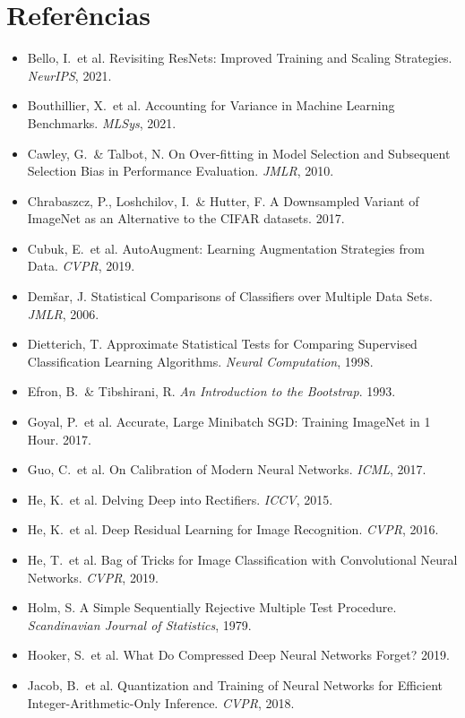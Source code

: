 \documentclass[10pt,a4paper]{article}
\begin{document}
\section*{Referências}
\begingroup\small\color{black!85}
\begin{itemize}[leftmargin=1.2em,itemsep=0.1em,topsep=0.2em,label={\color{accent}\textbullet}]
\item Bello, I.\ et al. Revisiting ResNets: Improved Training and Scaling Strategies. \emph{NeurIPS}, 2021.
\item Bouthillier, X.\ et al. Accounting for Variance in Machine Learning Benchmarks. \emph{MLSys}, 2021.
\item Cawley, G.\ \& Talbot, N. On Over-fitting in Model Selection and Subsequent Selection Bias in Performance Evaluation. \emph{JMLR}, 2010.
\item Chrabaszcz, P., Loshchilov, I.\ \& Hutter, F. A Downsampled Variant of ImageNet as an Alternative to the CIFAR datasets. 2017.
\item Cubuk, E.\ et al. AutoAugment: Learning Augmentation Strategies from Data. \emph{CVPR}, 2019.
\item Demšar, J. Statistical Comparisons of Classifiers over Multiple Data Sets. \emph{JMLR}, 2006.
\item Dietterich, T. Approximate Statistical Tests for Comparing Supervised Classification Learning Algorithms. \emph{Neural Computation}, 1998.
\item Efron, B.\ \& Tibshirani, R. \emph{An Introduction to the Bootstrap}. 1993.
\item Goyal, P.\ et al. Accurate, Large Minibatch SGD: Training ImageNet in 1 Hour. 2017.
\item Guo, C.\ et al. On Calibration of Modern Neural Networks. \emph{ICML}, 2017.
\item He, K.\ et al. Delving Deep into Rectifiers. \emph{ICCV}, 2015.
\item He, K.\ et al. Deep Residual Learning for Image Recognition. \emph{CVPR}, 2016.
\item He, T.\ et al. Bag of Tricks for Image Classification with Convolutional Neural Networks. \emph{CVPR}, 2019.
\item Holm, S. A Simple Sequentially Rejective Multiple Test Procedure. \emph{Scandinavian Journal of Statistics}, 1979.
\item Hooker, S.\ et al. What Do Compressed Deep Neural Networks Forget? 2019.
\item Jacob, B.\ et al. Quantization and Training of Neural Networks for Efficient Integer-Arithmetic-Only Inference. \emph{CVPR}, 2018.

\end{itemize}
\end{document}
